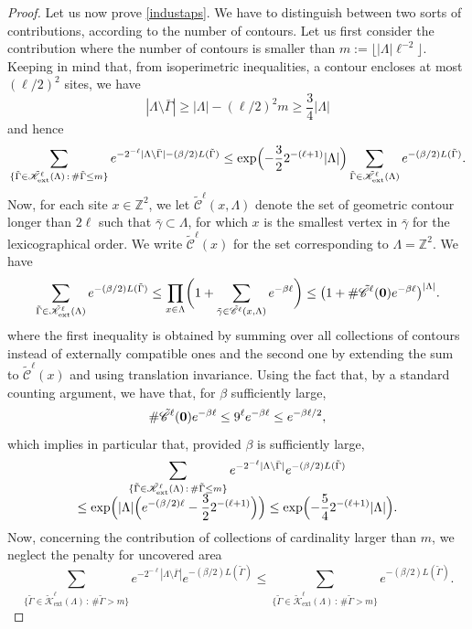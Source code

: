 \documentclass[JEP,XML,SOM,Unicode, NoFloatCountersInSection]{cedram}
\let\mathcal\mathscr
\newcommand{\sep}{\,:\,}
\numberwithin{equation}{section}
\theoremstyle{plain}
\theoremstyle{definition}
\newcommand{\ext}{\mathrm{ext}}
\newcommand{\cC}{{\ensuremath{\mathcal C}} }
\newcommand{\cK}{{\ensuremath{\mathcal K}} }
\newcommand{\bbZ}{{\ensuremath{\mathbb Z}} }
\newcommand{\gb}{\beta}
\newcommand{\gG}{\Gamma}
\newcommand{\gL}{\Lambda}
\begin{document}
\begin{proof}
Let us now prove \eqref{industaps}.
We have to distinguish between two sorts of contributions, according to the number of contours.
Let us first consider the contribution where the number of contours is smaller than $m:=\lfloor |\gL|\ell^{-2} \rfloor$.
Keeping in mind that, from isoperimetric inequalities, a contour encloses at most $(\ell/2)^2$ sites, we have
\[
|\gL\setminus \bar \gG|\ge |\gL|-(\ell/2)^2m \ge \frac{3}{4}|\gL|
\]
and hence
\begin{equation*}
\sum_{\{ \tilde \gG\in \tilde \cK^{\ell}_{\ext}(\gL)\sep \# \tilde \gG \le m \}} e^{-2^{-\ell} |\gL\setminus \bar \gG|-(\gb/2) L(\tilde\gG)}
\le \exp\Bigl(-\frac{3}{2} 2^{-(\ell+1)}|\gL|\Bigr) \sum_{\tilde \gG\in \tilde \cK^{\ell}_{\ext}(\gL)}e^{-(\gb/2)L(\tilde\gG)}.
\end{equation*}
Now, for each site $x\in \bbZ^2$, we let $\tilde\cC^{\ell}(x,\gL)$ denote the set of geometric contour longer than $2\ell$ such that
$\bar \gamma \subset \gL$, for which $x$ is the
smallest vertex in $\bar \gamma$ for the lexicographical order. We write $\tilde\cC^{\ell}(x)$ for the set corresponding to $\gL=\bbZ^2$.
We have
\begin{equation*}
\sum_{\tilde \gG\in \tilde \cK^{\ell}_{\ext}(\gL)}e^{-(\gb/2) L(\tilde\gG)}
\le \prod_{x\in \gL} \biggl(1+\sum_{\tilde \gamma \in \tilde\cC^{\ell}(x,\gL)} e^{-\gb\ell}\biggr) \le
\bigl(1+\#\tilde\cC^{\ell}({\bf 0}) e^{-\gb\ell}\bigr)^{|\gL|}.
\end{equation*}
where the first inequality is obtained by summing over all collections of contours instead of externally compatible ones and
the second one by extending the sum to $\tilde\cC^{\ell}(x)$ and using translation invariance.
Using the fact that, by a standard counting argument, we have that, for $\gb$ sufficiently large,
\[
\#\tilde\cC^{\ell}({\bf 0}) e^{-\gb\ell}\le 9^{\ell} e^{-\gb\ell}\le e^{-\gb\ell /2},
\]
which implies in particular that, provided $\gb$ is sufficiently large,
\begin{multline}\label{zapi}
\sum_{\{ \tilde \gG\in \tilde \cK^{\ell}_{\ext}(\gL)\sep \# \tilde \gG \le m \}} e^{-2^{-\ell} |\gL\setminus \bar \gG|}e^{-(\gb/2) L(\tilde\gG)}
\\[-5pt] \le \exp\Bigl(|\gL|\Bigl(e^{-(\gb /2) \ell}-\frac{3}{2} 2^{-(\ell+1)}\Bigr) \Bigr)\le \exp\Bigl(-\frac{5}{4}2^{-(\ell+1)} |\gL|\Bigr).
\end{multline}
Now, concerning the contribution of collections of cardinality larger than $m$, we neglect the penalty for uncovered area
\begin{equation*}
\sum_{\{ \tilde \gG\in \tilde \cK^{\ell}_{\ext}(\gL)\sep \# \tilde \gG > m \}} e^{-2^{-\ell} |\gL\setminus \bar \gG|}e^{-(\gb/2) L(\tilde\gG)}
\le \sum_{\{ \tilde \gG\in \tilde \cK^{\ell}_{\ext}(\gL)\sep \# \tilde \gG > m \}} e^{-(\gb/2) L(\tilde\gG)}.
\end{equation*}


\end{proof}
\end{document}
